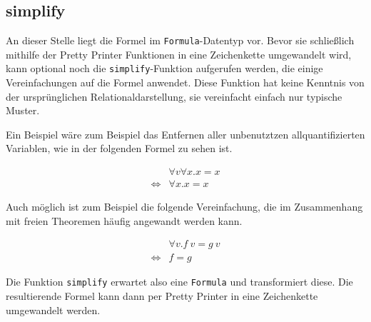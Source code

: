 
%


\subsection{simplify}

An dieser Stelle liegt die Formel im \texttt{Formula}-Datentyp vor. Bevor sie schließlich mithilfe der Pretty Printer Funktionen
in eine Zeichenkette umgewandelt wird, kann optional noch die \texttt{simplify}-Funktion aufgerufen werden, die einige
Vereinfachungen auf die Formel anwendet. Diese Funktion hat keine Kenntnis von der ursprünglichen Relationaldarstellung, sie
vereinfacht einfach nur typische Muster.

Ein Beispiel wäre zum Beispiel das Entfernen aller unbenutztzen allquantifizierten Variablen, wie in der folgenden Formel zu sehen
ist.

\begin{align*}
& \forall v \forall x . x = x \\
\Leftrightarrow & \forall x . x = x 
\end{align*}

Auch möglich ist zum Beispiel die folgende Vereinfachung, die im Zusammenhang mit freien Theoremen häufig angewandt werden
kann.

\begin{align*}
&\forall v . f\ v = g\ v\\
\Leftrightarrow & f = g
\end{align*}

Die Funktion \texttt{simplify} erwartet also eine \texttt{Formula} und transformiert diese. Die resultierende Formel kann
dann per Pretty Printer in eine Zeichenkette umgewandelt werden.



